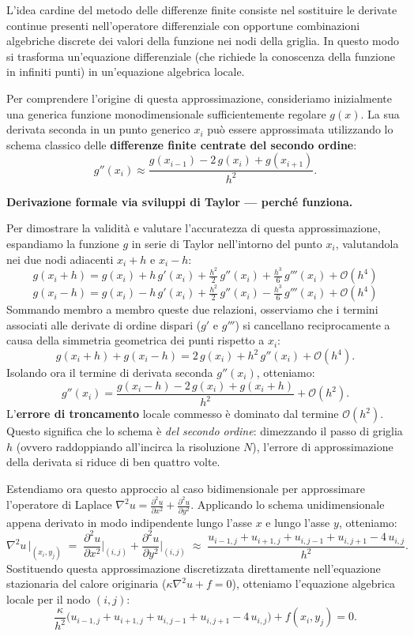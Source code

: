 \documentclass[a4paper,11pt]{article}
\theoremstyle{definition}
\begin{document}
L'idea cardine del metodo delle differenze finite consiste nel sostituire le derivate continue presenti nell'operatore differenziale con opportune combinazioni algebriche discrete dei valori della funzione nei nodi della griglia. In questo modo si trasforma un'equazione differenziale (che richiede la conoscenza della funzione in infiniti punti) in un'equazione algebrica locale.

Per comprendere l'origine di questa approssimazione, consideriamo inizialmente una generica funzione monodimensionale sufficientemente regolare $g(x)$. La sua derivata seconda in un punto generico $x_i$ può essere approssimata utilizzando lo schema classico delle \textbf{differenze finite centrate del secondo ordine}:
\[
  g''(x_i) \approx \frac{g(x_{i-1}) - 2\,g(x_i) + g(x_{i+1})}{h^2}.
\]

\begin{tcolorbox}[concetto]
\textbf{Derivazione formale via sviluppi di Taylor — perché funziona.}

Per dimostrare la validità e valutare l'accuratezza di questa approssimazione, espandiamo la funzione $g$ in serie di Taylor nell'intorno del punto $x_i$, valutandola nei due nodi adiacenti $x_i + h$ e $x_i - h$:
\[
  g(x_i + h) = g(x_i) + h\,g'(x_i) + \tfrac{h^2}{2}\,g''(x_i) + \tfrac{h^3}{6}\,g'''(x_i) + \mathcal{O}(h^4)
\]
\[
  g(x_i - h) = g(x_i) - h\,g'(x_i) + \tfrac{h^2}{2}\,g''(x_i) - \tfrac{h^3}{6}\,g'''(x_i) + \mathcal{O}(h^4)
\]
Sommando membro a membro queste due relazioni, osserviamo che i termini associati alle derivate di ordine dispari ($g'$ e $g'''$) si cancellano reciprocamente a causa della simmetria geometrica dei punti rispetto a $x_i$:
\[
  g(x_i+h) + g(x_i-h) = 2\,g(x_i) + h^2\,g''(x_i) + \mathcal{O}(h^4).
\]
Isolando ora il termine di derivata seconda $g''(x_i)$, otteniamo:
\[
  \boxed{g''(x_i) = \frac{g(x_i-h) - 2\,g(x_i) + g(x_i+h)}{h^2} + \mathcal{O}(h^2).}
\]
L'\textbf{errore di troncamento} locale commesso è dominato dal termine $\mathcal{O}(h^2)$. Questo significa che lo schema è \emph{del secondo ordine}: dimezzando il passo di griglia $h$ (ovvero raddoppiando all'incirca la risoluzione $N$), l'errore di approssimazione della derivata si riduce di ben quattro volte.
\end{tcolorbox}

\medskip
Estendiamo ora questo approccio al caso bidimensionale per approssimare l'operatore di Laplace $\nabla^2 u = \frac{\partial^2 u}{\partial x^2} + \frac{\partial^2 u}{\partial y^2}$. Applicando lo schema unidimensionale appena derivato in modo indipendente lungo l'asse $x$ e lungo l'asse $y$, otteniamo:
\[
  \nabla^2 u\,\big|_{(x_i,y_j)}
  \;=\;
  \frac{\partial^2 u}{\partial x^2}\bigg|_{(i,j)}
  + \frac{\partial^2 u}{\partial y^2}\bigg|_{(i,j)}
  \;\approx\;
  \frac{u_{i-1,j} + u_{i+1,j} + u_{i,j-1} + u_{i,j+1} - 4\,u_{i,j}}{h^2}.
\]
Sostituendo questa approssimazione discretizzata direttamente nell'equazione stazionaria del calore originaria ($\kappa \nabla^2 u + f = 0$), otteniamo l'equazione algebrica locale per il nodo $(i,j)$:
\begin{equation}
  \frac{\kappa}{h^2}\bigl(u_{i-1,j} + u_{i+1,j} + u_{i,j-1} + u_{i,j+1} - 4\,u_{i,j}\bigr)
  + f(x_i,y_j) = 0.
  \label{eq:stencil}
\end{equation}
\end{document}
